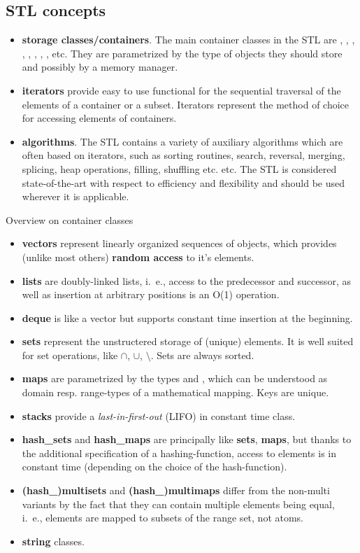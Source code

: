 \subsection{STL concepts}
\begin{itemize}
\item \textbf{storage classes/containers}. The main container classes in the STL are , , , , , , , , etc. They are parametrized by the type of objects they should store and possibly by a memory manager.
\item \textbf{iterators} provide easy to use functional for the sequential traversal of the elements of a container or a subset. Iterators represent the method of choice for accessing elements of containers.
\item \textbf{algorithms}. The STL contains a variety of auxiliary algorithms which are often based on iterators, such as sorting routines, search, reversal, merging, splicing, heap operations, filling, shuffling etc. etc. The STL is considered state-of-the-art with respect to efficiency and flexibility and should be used wherever it is applicable.
\end{itemize}


\centerline{\large Overview on container classes}
\begin{itemize}
\item \textbf{vectors} represent linearly organized sequences of objects, which provides (unlike most others) \textbf{random access} to it's elements.
\item \textbf{lists} are doubly-linked lists, i.~e., access to the predecessor and successor, as well as insertion at arbitrary positions is an O(1) operation.
\item \textbf{deque} is like a vector but supports constant time insertion at the beginning.
\item \textbf{sets} represent the unstructered storage of (unique) elements. It is well suited for set operations, like $\cap$, $\cup$, $\setminus$. Sets are always sorted.
\item \textbf{maps} are parametrized by the types  and , which can be understood as domain resp. range-types of a mathematical mapping. Keys are unique.
\item \textbf{stacks} provide a {\em last-in-first-out} (LIFO) in constant time class.
\item \textbf{hash\_sets} and \textbf{hash\_maps} are principally like \textbf{sets}, \textbf{maps}, but thanks to the additional specification of a hashing-function,
access to elements is in constant time (depending on the choice of the hash-function).

\item \textbf{(hash\_)multisets} and \textbf{(hash\_)multimaps} differ from the non-multi variants by the fact that they can contain multiple elements being equal, i.~e., elements are mapped to subsets of the range set, not atoms.

\item \textbf{string} classes.

\end{itemize}


